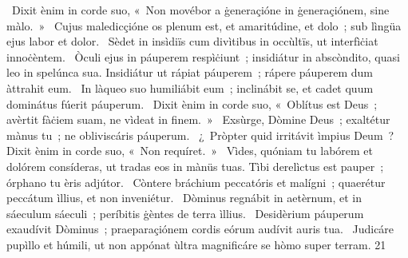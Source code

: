 {~Dixit ènim in corde suo, «~Non movébor a ġeneraçióne in ġeneraçiónem, sine màlo.~»
~Cujus maledicçióne os plenum est, et amaritúdine, et dolo~; sub lìngüa ejus labor et dolor.
~Sèdet in insìdiïs cum divìtibus in occùltïs, ut interfìċiat innoċèntem.
~Òculi ejus in páuperem respìċiunt~; insidiátur in abscòndito, quasi leo in spelúnca sua. Insidiátur ut rápiat páuperem~; rápere páuperem dum àttrahit eum.
~In làqueo suo humiliábit eum~; inclinábit se, et cadet quum dominátus fúerit páuperum.
~Dixit ènim in corde suo, «~Oblítus est Deus~; avèrtit fàċiem suam, ne vìdeat in finem.~»
~Exsùrge, Dòmine Deus~; exaltétur mànus tu~; ne obliviscáris páuperum.
~¿~Pròpter quid irritávit ìmpius Deum~? Dixit ènim in corde suo, «~Non requíret.~»
~Vìdes, quóniam tu labórem et dolórem consíderas, ut tradas eos in mànüs tuas. Tìbi derelìctus est pauper~; órphano tu èris adjútor.
~Còntere bráchium peccatóris et malígni~; quaerétur peccátum ìllius, et non inveniétur.
~Dòminus regnábit in aetèrnum, et in sáeculum sáeculi~; períbitis ġèntes de terra ìllius.
~Desidèrium páuperum exaudívit Dòminus~; praeparaçiónem cordis eórum audívit auris tua.
~Judicáre pupìllo et húmili, ut non appónat ùltra magnificáre se hòmo super terram.
}
{2}{1}
